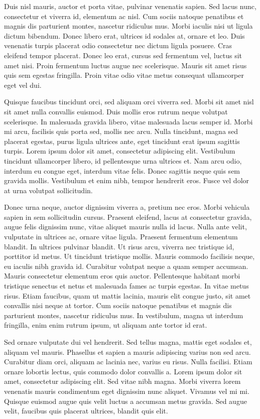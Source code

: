 Duis nisl mauris, auctor et porta vitae, pulvinar venenatis sapien.
Sed lacus nunc, consectetur et viverra id, elementum ac nisl.
Cum sociis natoque penatibus et magnis dis parturient montes, nascetur ridiculus mus.
Morbi iaculis nisi ut ligula dictum bibendum.
Donec libero erat, ultrices id sodales at, ornare et leo.
Duis venenatis turpis placerat odio consectetur nec dictum ligula posuere.
Cras eleifend tempor placerat.
Donec leo erat, cursus sed fermentum vel, luctus sit amet nisi.
Proin fermentum luctus augue nec scelerisque.
Mauris sit amet risus quis sem egestas fringilla.
Proin vitae odio vitae metus consequat ullamcorper eget vel dui.

Quisque faucibus tincidunt orci, sed aliquam orci viverra sed.
Morbi sit amet nisl sit amet nulla convallis euismod.
Duis mollis eros rutrum neque volutpat scelerisque.
In malesuada gravida libero, vitae malesuada lacus semper id.
Morbi mi arcu, facilisis quis porta sed, mollis nec arcu.
Nulla tincidunt, magna sed placerat egestas, purus ligula ultrices ante, eget tincidunt erat ipsum sagittis turpis.
Lorem ipsum dolor sit amet, consectetur adipiscing elit.
Vestibulum tincidunt ullamcorper libero, id pellentesque urna ultrices et.
Nam arcu odio, interdum eu congue eget, interdum vitae felis.
Donec sagittis neque quis sem gravida mollis.
Vestibulum et enim nibh, tempor hendrerit eros.
Fusce vel dolor at urna volutpat sollicitudin.

Donec urna neque, auctor dignissim viverra a, pretium nec eros.
Morbi vehicula sapien in sem sollicitudin cursus.
Praesent eleifend, lacus at consectetur gravida, augue felis dignissim nunc, vitae aliquet mauris nulla id lacus.
Nulla ante velit, vulputate in ultrices ac, ornare vitae ligula.
Praesent fermentum elementum blandit.
In ultrices pulvinar blandit.
Ut risus arcu, viverra nec tristique id, porttitor id metus.
Ut tincidunt tristique mollis.
Mauris commodo facilisis neque, eu iaculis nibh gravida id.
Curabitur volutpat neque a quam semper accumsan.
Mauris consectetur elementum eros quis auctor.
Pellentesque habitant morbi tristique senectus et netus et malesuada fames ac turpis egestas.
In vitae metus risus.
Etiam faucibus, quam ut mattis lacinia, mauris elit congue justo, sit amet convallis nisi neque at tortor.
Cum sociis natoque penatibus et magnis dis parturient montes, nascetur ridiculus mus.
In vestibulum, magna ut interdum fringilla, enim enim rutrum ipsum, ut aliquam ante tortor id erat.

Sed ornare vulputate dui vel hendrerit.
Sed tellus magna, mattis eget sodales et, aliquam vel mauris.
Phasellus et sapien a mauris adipiscing varius non sed arcu.
Curabitur diam orci, aliquam ac lacinia nec, varius eu risus.
Nulla facilisi.
Etiam ornare lobortis lectus, quis commodo dolor convallis a.
Lorem ipsum dolor sit amet, consectetur adipiscing elit.
Sed vitae nibh magna.
Morbi viverra lorem venenatis mauris condimentum eget dignissim nunc aliquet.
Vivamus vel mi mi.
Quisque euismod augue quis velit luctus a accumsan metus gravida.
Sed augue velit, faucibus quis placerat ultrices, blandit quis elit.

